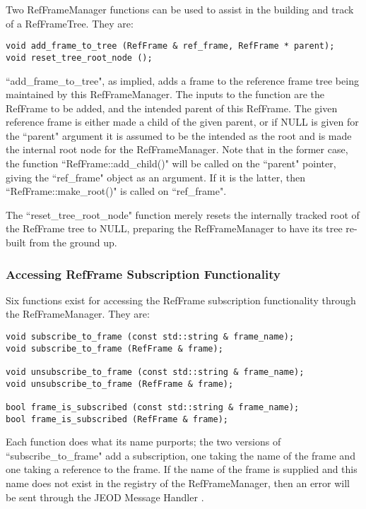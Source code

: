 Two RefFrameManager functions can be used to assist in
the building and track of a RefFrameTree. They are:

\begin{verbatim}
void add_frame_to_tree (RefFrame & ref_frame, RefFrame * parent);
void reset_tree_root_node ();
\end{verbatim}

``add\_frame\_to\_tree", as implied, adds a frame to the reference
frame tree being maintained by this RefFrameManager. The inputs to
the function are the RefFrame to be added, and the intended parent
of this RefFrame. The given reference frame is either made
a child of the given parent, or if NULL is given
for the ``parent" argument it is assumed to be the
intended as the root and is made the internal
root node for the RefFrameManager. Note that in the former case,
the function ``RefFrame::add\_child()" will be called on the ``parent"
pointer, giving the ``ref\_frame" object as an argument. If
it is the latter, then ``RefFrame::make\_root()" is called on
``ref\_frame".

The ``reset\_tree\_root\_node" function merely resets the internally
tracked root of the RefFrame tree to NULL, preparing the RefFrameManager
to have its tree re-built from the ground up.

\subsubsection{Accessing RefFrame Subscription Functionality}

Six functions exist for accessing the RefFrame subscription
functionality through the RefFrameManager. They are:

\begin{verbatim}
void subscribe_to_frame (const std::string & frame_name);
void subscribe_to_frame (RefFrame & frame);

void unsubscribe_to_frame (const std::string & frame_name);
void unsubscribe_to_frame (RefFrame & frame);

bool frame_is_subscribed (const std::string & frame_name);
bool frame_is_subscribed (RefFrame & frame);
\end{verbatim}

Each function does what its name purports; the two versions of
``subscribe\_to\_frame" add a subscription, one taking
the name of the frame and one taking a reference to the frame.
If the name of the frame is supplied and this name does not
exist in the registry of the RefFrameManager, then an error
will be sent through the JEOD Message Handler \cite{dynenv:MESSAGE}.

